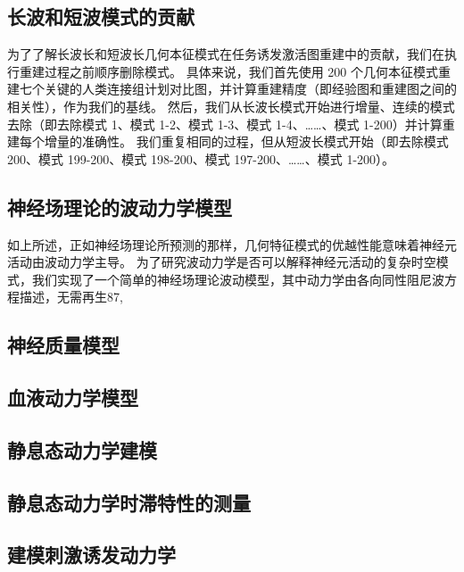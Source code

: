 \documentclass[lang=cn,a4paper,newtx]{elegantpaper}
\begin{document}
\subsection{长波和短波模式的贡献} \label{sec:wavelength_contributions}

为了了解长波长和短波长几何本征模式在任务诱发激活图重建中的贡献，我们在执行重建过程之前顺序删除模式。
具体来说，我们首先使用 200 个几何本征模式重建七个关键的人类连接组计划对比图，并计算重建精度（即经验图和重建图之间的相关性），作为我们的基线。
然后，我们从长波长模式开始进行增量、连续的模式去除（即去除模式 1、模式 1-2、模式 1-3、模式 1-4、……、模式 1-200）并计算重建每个增量的准确性。
我们重复相同的过程，但从短波长模式开始（即去除模式 200、模式 199-200、模式 198-200、模式 197-200、……、模式 1-200）。


\subsection{神经场理论的波动力学模型} \label{NFT_model}

如上所述，正如神经场理论所预测的那样，几何特征模式的优越性能意味着神经元活动由波动力学主导。
为了研究波动力学是否可以解释神经元活动的复杂时空模式，我们实现了一个简单的神经场理论波动模型，其中动力学由各向同性阻尼波方程描述，无需再生\cite{jirsa1996field,robinson1997propagation}87,


\subsection{神经质量模型} \label{sec:neural_mass}

\subsection{血液动力学模型} \label{sec:haemodynamic_model}

\subsection{静息态动力学建模} \label{sec:modelling_resting}

\subsection{静息态动力学时滞特性的测量} \label{sec:dynamics_measurement}

\subsection{建模刺激诱发动力学} \label{sec:modelling_stimulus}
\end{document}
